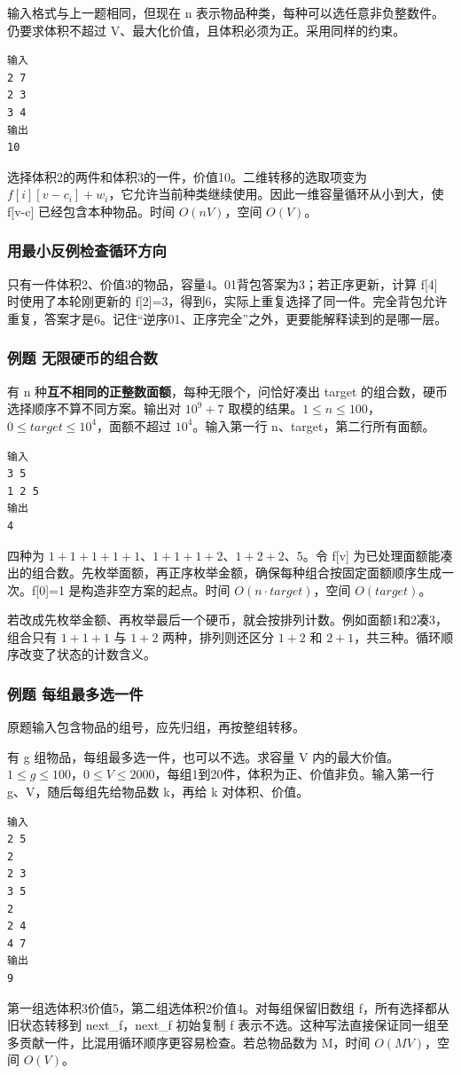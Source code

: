 输入格式与上一题相同，但现在 n 表示物品种类，每种可以选任意非负整数件。仍要求体积不超过 V、最大化价值，且体积必须为正。采用同样的约束。
\begin{verbatim}
输入
2 7
2 3
3 4
输出
10
\end{verbatim}
选择体积2的两件和体积3的一件，价值10。二维转移的选取项变为 $f[i][v-c_i]+w_i$，它允许当前种类继续使用。因此一维容量循环从小到大，使 f[v-c] 已经包含本种物品。时间 $O(nV)$，空间 $O(V)$。

\subsubsection{用最小反例检查循环方向}
只有一件体积2、价值3的物品，容量4。01背包答案为3；若正序更新，计算 f[4] 时使用了本轮刚更新的 f[2]=3，得到6，实际上重复选择了同一件。完全背包允许重复，答案才是6。记住“逆序01、正序完全”之外，更要能解释读到的是哪一层。

\subsubsection{例题 无限硬币的组合数}
有 n 种\textbf{互不相同的正整数面额}，每种无限个，问恰好凑出 target 的组合数，硬币选择顺序不算不同方案。输出对 $10^9+7$ 取模的结果。$1\le n\le100$，$0\le target\le10^4$，面额不超过 $10^4$。输入第一行 n、target，第二行所有面额。
\begin{verbatim}
输入
3 5
1 2 5
输出
4
\end{verbatim}
四种为 $1+1+1+1+1$、$1+1+1+2$、$1+2+2$、5。令 f[v] 为已处理面额能凑出的组合数。先枚举面额，再正序枚举金额，确保每种组合按固定面额顺序生成一次。f[0]=1 是构造非空方案的起点。时间 $O(n\cdot target)$，空间 $O(target)$。

若改成先枚举金额、再枚举最后一个硬币，就会按排列计数。例如面额1和2凑3，组合只有 $1+1+1$ 与 $1+2$ 两种，排列则还区分 $1+2$ 和 $2+1$，共三种。循环顺序改变了状态的计数含义。

\subsubsection{例题 每组最多选一件}
原题输入包含物品的组号，应先归组，再按整组转移。

有 g 组物品，每组最多选一件，也可以不选。求容量 V 内的最大价值。$1\le g\le100$，$0\le V\le2000$，每组1到20件，体积为正、价值非负。输入第一行 g、V，随后每组先给物品数 k，再给 k 对体积、价值。
\begin{verbatim}
输入
2 5
2
2 3
3 5
2
2 4
4 7
输出
9
\end{verbatim}
第一组选体积3价值5，第二组选体积2价值4。对每组保留旧数组 f，所有选择都从旧状态转移到 next\_f，next\_f 初始复制 f 表示不选。这种写法直接保证同一组至多贡献一件，比混用循环顺序更容易检查。若总物品数为 M，时间 $O(MV)$，空间 $O(V)$。

